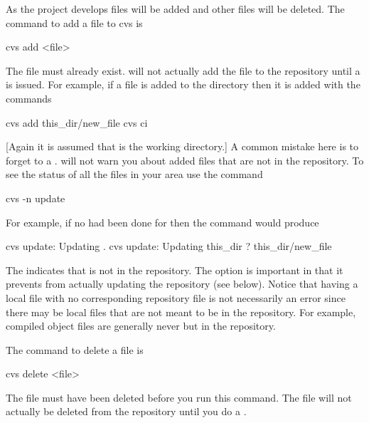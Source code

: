 As the project develops files will be added and other files will be
deleted. The command to add a file to cvs is
\begin{example}
  cvs add <file>
\end{example}
The file must already exist. \cvs will not actually add the file to
the repository until a  is issued. For example, if a file
 is added to the  directory then it is added
with the commands
\begin{example}
  cvs add this_dir/new_file
  cvs ci
\end{example}
[Again it is assumed that  is the working directory.] A common
mistake here is to forget to a .  will not warn
you about added files that are not in the repository. To see the
status of all the files in your area use the command
\begin{example}
  cvs -n update
\end{example}
For example, if no  had been done for  then
the  command would produce
\begin{example}
  cvs update: Updating .
  cvs update: Updating this_dir
  ? this_dir/new_file
\end{example}
The  indicates that  is not in the repository. The
 option is important in that it prevents  from actually
updating the repository (see below). Notice that having a local file
with no corresponding repository file is not necessarily an error
since there may be local files that are not meant to be in the
repository. For example, compiled object files are generally never but
in the repository.

The command to delete a file is
\begin{example}
  cvs delete <file>
\end{example}
The file must have been deleted before you run this command. The file
will not actually be deleted from the repository until you do a
.


